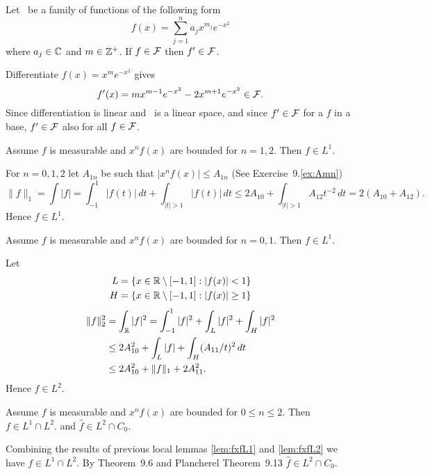\begin{llem} \label{llem:9.calF}
Let \calF\ be a family of functions of the following form
\begin{equation*}
f(x) = \sum_{j=1}^n a_jx^{m_j}e^{-x^2}
\end{equation*}
where \(a_j\in\mathbb{C}\) and \(m\in\mathbb{Z}^+\).
If \(f \in \mathcal{F}\) then \(f'\in\mathcal{F}\).
\end{llem}
\begin{thmproof}
Differentiate \(f(x) = x^me^{-x^2}\) gives
\begin{equation*}
f'(x) = mx^{m-1} e^{-x^2} -2x^{m+1}e^{-x^2} \in \mathcal{F}.
\end{equation*}
Since differentiation is linear and \calF\ is a linear space,
and since \(f'\in \mathcal{F}\) for a $f$ in a base, \(f'\in \mathcal{F}\) also for
all \(f\in \mathcal{F}\).
\end{thmproof}


\begin{llem} \label{lem:fxfL1}
Assume $f$ is measurable and \(x^nf(x)\) are bounded for \(n=1,2\).
Then \(f\in L^1\).
\end{llem}
\begin{thmproof}
For \(n=0,1,2\) let \(A_{1n}\) be such that 
\(|x^nf(x)| \leq A_{1n}\) (See Exercise~9.\ref{ex:Amn})
\begin{equation*}
\|f\|_1 
= \int |f|
= \int_{-1}^1 |f(t)|\,dt + \int_{|t|>1} |f(t)|\,dt
\leq 2A_{10} + \int_{|t|>1} A_{12}t^{-2}\,dt
= 2(A_{10} + A_{12}).
\end{equation*}
Hence \(f\in L^1\).


\begin{llem} \label{lem:fxfL2}
Assume $f$ is measurable and \(x^nf(x)\) are bounded for \(n=0,1\).
Then \(f\in L^1\).
\end{llem}
Let
\begin{align*}
L &= \{x\in\mathbb{R}\setminus[-1,1]: |f(x)| < 1\} \\
H &= \{x\in\mathbb{R}\setminus[-1,1]: |f(x)| \geq 1\}
\end{align*}
\begin{align*}
\|f\|_2^2 
&= \int_{\mathbb{R}} |f|^2
= \int_{-1}^1 |f|^2 + \int_L |f|^2 + \int_H |f|^2 \\
&\leq 2A_{10}^2 + \int_L |f| + \int_H (A_{11}/t)^2\,dt \\
&\leq 2A_{10}^2 + \|f\|_1 + 2A_{11}^2.
\end{align*}
Hence \(f\in L^2\).
\end{thmproof}


\begin{llem} \label{lem:fxfL12}
Assume $f$ is measurable and \(x^nf(x)\) are bounded for \(0 \leq n \leq 2\).
Then
 \(f\in L^1\cap L^2\).
and
 \(\hat{f}\in L^2\cap C_0\).
\end{llem}
\begin{thmproof}
Combining the results of previous local lemmas 
\ref{lem:fxfL1} and \ref{lem:fxfL2}
we have \(f\in L^1\cap L^2\).
By 
Theorem~9.6 and
Plancherel Theorem~9.13 \(\hat{f}\in L^2\cap C_0\).
\end{thmproof}

